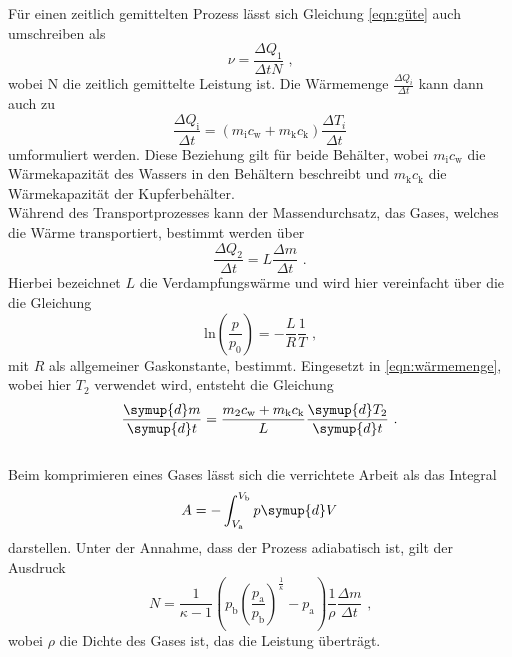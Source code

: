 \noindent Für einen zeitlich gemittelten Prozess lässt sich Gleichung \ref{eqn:güte} auch umschreiben als
\begin{equation}
    \nu=\frac{\Delta Q_1}{\Delta tN} \text{ ,}
    \label{eqn:gütemittel}
\end{equation}
wobei N die zeitlich gemittelte Leistung ist. Die Wärmemenge $\frac{\Delta Q_i}{\Delta t}$ kann dann auch zu
\begin{equation}
    \frac{\Delta Q_{\mathrm{i}}}{\Delta t}=(m_{\mathrm{i}}c_{\mathrm{w}}+m_{\mathrm{k}}c_{\mathrm{k}})\frac{\Delta T_i}{\Delta t}
    \label{eqn:wärmemenge}
\end{equation}
umformuliert werden. Diese Beziehung gilt für beide Behälter, wobei $m_{\mathrm{i}}c_{\mathrm{w}}$ die Wärmekapazität des Wassers
in den Behältern beschreibt und $m_{\mathrm{k}}c_{\mathrm{k}}$ die Wärmekapazität der Kupferbehälter.\\

\noindent Während des Transportprozesses kann der Massendurchsatz, das Gases, welches die
Wärme transportiert, bestimmt werden über
\begin{equation}
    \frac{\Delta Q_2}{\Delta t}=L\frac{\Delta m}{\Delta t} \text{ .}
    \label{eqn:Dampf}
\end{equation}
Hierbei bezeichnet $L$ die Verdampfungswärme und wird hier vereinfacht über die die Gleichung
\begin{equation}
    \mathrm{ln} \left(\frac{p}{p_0}\right)=-\frac{L}{R}\frac{1}{T}   \text{ ,}
    \label{eqn:verdampf}
\end{equation}
mit $R$ als allgemeiner Gaskonstante, bestimmt. Eingesetzt in \ref{eqn:wärmemenge}, wobei hier $T_2$ verwendet wird, 
entsteht die Gleichung
\begin{equation}
    \frac{\symup{d}m}{\symup{d}t}=\frac{m_2c_{\mathrm{w}}+m_{\mathrm{k}}c_{\mathrm{k}}}{L}\frac{\symup{d}T_2}{\symup{d}t} \text{ .}
    \label{eqn:masse}
\end{equation}
\\

\noindent Beim komprimieren eines Gases lässt sich die verrichtete Arbeit als das Integral
\begin{equation*}
    A=-\int_{V_{\mathrm{a}}}^{V_{\mathrm{b}}}p \symup{d}V
\end{equation*}
darstellen. Unter der Annahme, dass der Prozess adiabatisch ist, gilt der Ausdruck
\begin{equation}
    N=\frac{1}{\kappa -1}\left(p_{\mathrm{b}}\left(\frac{p_{\mathrm{a}}}{p_{\mathrm{b}}}\right)^{\frac{1}{\kappa}}-p_{\mathrm{a}}\right)\frac{1}{\rho}\frac{\Delta m}{\Delta t} \text{ ,}
    \label{eqn:leistung}
\end{equation}
wobei $\rho$ die Dichte des Gases ist, das die Leistung überträgt.